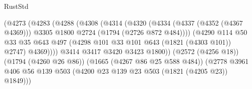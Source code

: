 \begin{lexlean}{RustStd}
\begin{coremodule}
                                            (@4273
                                              (@4283
                                                (@4288
                                                  (@4308
                                                    (@4314
                                                      (@4320
                                                        (@4334
                                                          (@4337 (@4352 (@4367 @4369)))
                                                          @3305
                                                          @1800
                                                          @2724
                                                          (@1794 (@2726 @872 @484))))
                                                      (@4290
                                                        @114
                                                        @50
                                                        @33
                                                        @35
                                                        @643
                                                        @497
                                                        (@4298
                                                          @101
                                                          @33
                                                          @101
                                                          @643
                                                          (@1821 (@4303 @101))
                                                          @2747)
                                                        @4369))))
                                                @3414
                                                @3417
                                                @3420
                                                @3423
                                                @1800))
                                            (@2572 (@4256 @18))
                                            (@1794 (@4260 @26 @86))
                                            (@1665 (@4267 @86 @25 @588 @484))
                                            (@2778
                                              @3961
                                              @406
                                              @56
                                              @139
                                              @503
                                              (@4200 @23 @139 @23 @503 (@1821 (@4205 @23)) @1849)))

\end{coremodule}
\end{lexlean}
